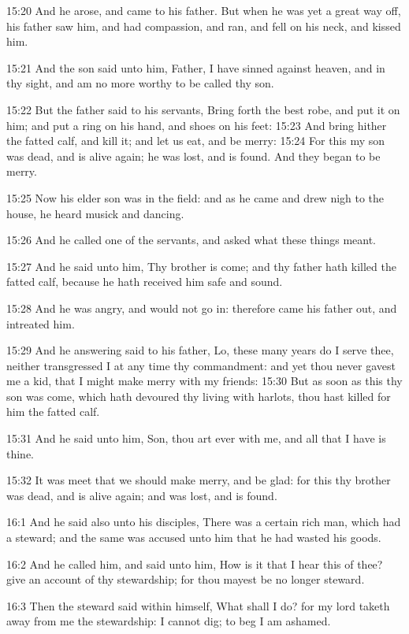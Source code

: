 15:20 And he arose, and came to his father. But when he was yet a
great way off, his father saw him, and had compassion, and ran, and
fell on his neck, and kissed him.

15:21 And the son said unto him, Father, I have sinned against heaven,
and in thy sight, and am no more worthy to be called thy son.

15:22 But the father said to his servants, Bring forth the best robe,
and put it on him; and put a ring on his hand, and shoes on his feet:
15:23 And bring hither the fatted calf, and kill it; and let us eat,
and be merry: 15:24 For this my son was dead, and is alive again; he
was lost, and is found. And they began to be merry.

15:25 Now his elder son was in the field: and as he came and drew nigh
to the house, he heard musick and dancing.

15:26 And he called one of the servants, and asked what these things
meant.

15:27 And he said unto him, Thy brother is come; and thy father hath
killed the fatted calf, because he hath received him safe and sound.

15:28 And he was angry, and would not go in: therefore came his father
out, and intreated him.

15:29 And he answering said to his father, Lo, these many years do I
serve thee, neither transgressed I at any time thy commandment: and
yet thou never gavest me a kid, that I might make merry with my
friends: 15:30 But as soon as this thy son was come, which hath
devoured thy living with harlots, thou hast killed for him the fatted
calf.

15:31 And he said unto him, Son, thou art ever with me, and all that I
have is thine.

15:32 It was meet that we should make merry, and be glad: for this thy
brother was dead, and is alive again; and was lost, and is found.

16:1 And he said also unto his disciples, There was a certain rich
man, which had a steward; and the same was accused unto him that he
had wasted his goods.

16:2 And he called him, and said unto him, How is it that I hear this
of thee? give an account of thy stewardship; for thou mayest be no
longer steward.

16:3 Then the steward said within himself, What shall I do? for my
lord taketh away from me the stewardship: I cannot dig; to beg I am
ashamed.

